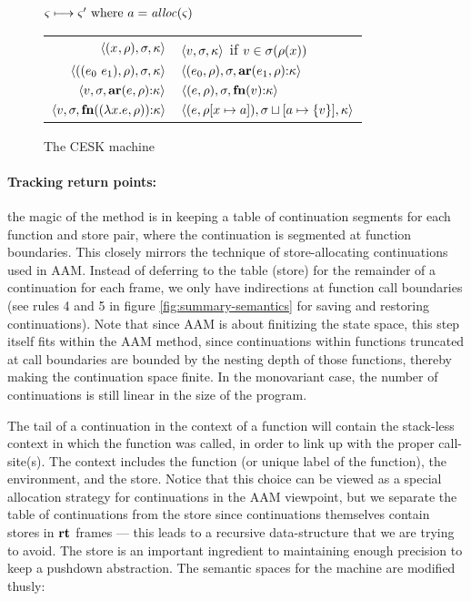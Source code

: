 \begin{figure}
  \centering
  $\varsigma \longmapsto \varsigma' \text{ where } a = \mathit{alloc}(\varsigma)$ \\
  \begin{tabular}{r|l}
    \hline
    $\langle (x^{{}}, \rho), \sigma, \kappa \rangle$
    &
    $\langle v,\sigma,\kappa \rangle$ if $v \in \sigma(\rho(x))$
    \\
    $\langle ((e_{0}\ e_{1}){}, \rho), \sigma, \kappa \rangle$
    &
    $\langle (e_{0}, \rho), \sigma, \mathbf{ar}{}(e_{1},\rho){\tt :} \kappa \rangle$
    \\
    $\langle v, \sigma, \mathbf{ar}{}(e,\rho){\tt :} \kappa \rangle$
    &
    $\langle (e, \rho), \sigma, \mathbf{fn}{}(v){\tt :} \kappa \rangle$
    \\
    $\langle v,\sigma,\mathbf{fn}{}((\lambda{} x. e, \rho)){\tt :} \kappa \rangle$
    &
    $\langle (e, \rho[x \mapsto a]), \sigma\sqcup[a \mapsto \{ v \}], \kappa \rangle$
  \end{tabular}
  \caption{The CESK machine}
  \label{fig:base-semantics}
\end{figure}

\paragraph{Tracking return points:} the magic of the method is in keeping a table of continuation segments for each function and store pair, where the continuation is segmented at function boundaries.
%
This closely mirrors the technique of store-allocating continuations used in AAM.
%
Instead of deferring to the table (store) for the remainder of a continuation for each frame, we only have indirections at function call boundaries (see rules 4 and 5 in figure \ref{fig:summary-semantics} for saving and restoring continuations).
%
Note that since AAM is about finitizing the state space, this step itself fits within the AAM method, since continuations within functions truncated at call boundaries are bounded by the nesting depth of those functions, thereby making the continuation space finite.
%
In the monovariant case, the number of continuations is still linear in the size of the program.

The tail of a continuation in the context of a function will contain the stack-less context in which the function was called, in order to link up with the proper call-site(s).
%
The context includes the function (or unique label of the function), the environment, and the store.
%
Notice that this choice can be viewed as a special allocation strategy for continuations in the AAM viewpoint, but we separate the table of continuations from the store since continuations themselves contain stores in $\mathbf{rt}$ frames --- this leads to a recursive data-structure that we are trying to avoid.
%
The store is an important ingredient to maintaining enough precision to keep a pushdown abstraction.
%
The semantic spaces for the machine are modified thusly:

